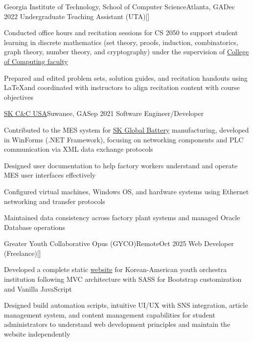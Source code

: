 \begin{resume-itemize}
  {Georgia Institute of Technology, School of Computer Science}{Atlanta, GA}{Dec 2022}
  {Undergraduate Teaching Assistant (UTA)}[\href{https://github.com/YundaeLeeSong/ydjs-references/tree/main/work2212-gt_compsci_ta}{}]
  \item Conducted office hours and recitation sessions for CS 2050 to support student learning in 
  discrete mathematics (set theory, proofs, induction, combinatorics, graph theory, number theory, and cryptography) 
  under the supervision of \href{https://www.cc.gatech.edu/people/faculty}{College of Computing faculty}
  \item Prepared and edited problem sets, solution guides, and recitation handouts using 
  \LaTeX and coordinated with instructors to align recitation content with course objectives
\end{resume-itemize}
\begin{resume-itemize}
  {\href{https://www.skaxus.com/}{SK C\&C USA}}{Suwanee, GA}{Sep 2021}
  {Software Engineer/Developer}
  \item Contributed to the MES system for \href{https://www.skbatteryamerica.com/}{SK Global Battery} 
  manufacturing, developed in WinForms (.NET Framework), focusing on networking 
  components and PLC communication via XML data exchange protocols
  \item Designed user documentation to help factory workers understand and 
  operate MES user interfaces effectively
  \item Configured virtual machines, Windows OS, and hardware systems using 
  Ethernet networking and transfer protocols
  \item Maintained data consistency across factory plant systems and managed 
  Oracle Database operations
\end{resume-itemize}
\begin{resume-itemize}
  {Greater Youth Collaborative Opus (GYCO)}{Remote}{Oct 2025}
  {Web Developer (Freelance)}[\href{https://github.com/kate-yk/kate-yk.github.io}{}]
  \item Developed a complete static \href{https://kate-yk.github.io/index.html}{website} for Korean-American youth orchestra institution 
  following MVC architecture with SASS for Bootstrap customization and Vanilla JavaScript
  \item Designed build automation scripts, intuitive UI/UX with SNS integration, 
  article management system, and content management capabilities for student administrators
  to understand web development principles and maintain the website independently
\end{resume-itemize}
